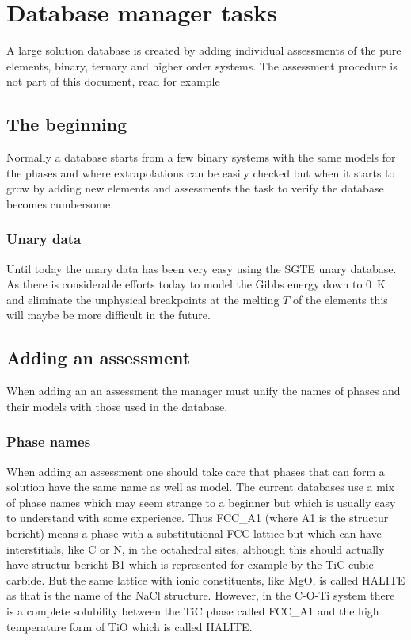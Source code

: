 \documentclass[12pt]{article}
\begin{document}
\section{Database manager tasks}\label{sec:manager}

A large solution database is created by adding individual assessments
of the pure elements, binary, ternary and higher order systems.
The assessment procedure is not part of this document, read for
example~\cite{07Luk}

\subsection{The beginning}

Normally a database starts from a few binary systems with the same
models for the phases and where extrapolations can be easily checked
but when it starts to grow by adding new elements and assessments the
task to verify the database becomes cumbersome.

\subsubsection{Unary data}

Until today the unary data has been very easy using the SGTE unary
database\cite{91Din}.  As there is considerable efforts today to model
the Gibbs energy down to 0~K and eliminate the unphysical breakpoints
at the melting $T$ of the elements this will maybe be more difficult
in the future.

\subsection{Adding an assessment}

When adding an an assessment the manager must unify the names of
phases and their models with those used in the database.

\subsubsection{Phase names}

When adding an assessment one should take care that phases that can
form a solution have the same name as well as model.  The current
databases use a mix of phase names which may seem strange to a
beginner but which is usually easy to understand with some experience.
Thus FCC\_A1 (where A1 is the structur bericht) means a phase with a
substitutional FCC lattice but which can have interstitials, like C or
N, in the octahedral sites, although this should actually have
structur bericht B1 which is represented for example by the TiC cubic
carbide.  But the same lattice with ionic constituents, like MgO, is
called HALITE as that is the name of the NaCl structure.  However, in
the C-O-Ti system there is a complete solubility between the TiC phase
called FCC\_A1 and the high temperature form of TiO which is called
HALITE.
\end{document}
